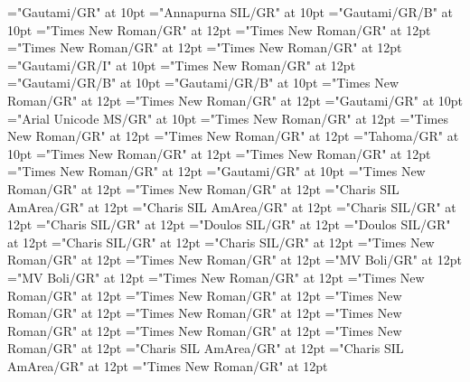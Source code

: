 \documentclass[a4paper]{article}
\begin{document}
\pagestyle{plain}
\sloppy
\setlength{\parfillskip}{0pt plus 1fil}
\font\xitemte="Gautami/GR" at 10pt
\font\xitemhi="Annapurna SIL/GR" at 10pt
\font\xitemxitemcomplexformformbefore="Gautami/GR/B" at 10pt
\font\xitemxitemcomplexformrefsbefore="Times New Roman/GR" at 12pt
\font\xitemxitemdefinitionbefore="Times New Roman/GR" at 12pt
\font\xitemxitementryrefcomponentbefore="Times New Roman/GR" at 12pt
\font\xitemxitementryreftypebefore="Times New Roman/GR" at 12pt
\font\xitemxitemexamplebefore="Gautami/GR/I" at 10pt
\font\xitemxitemexamplesbefore="Times New Roman/GR" at 12pt
\font\xitemxitemheadwordbefore="Gautami/GR/B" at 10pt
\font\xitemxitemLexEntrypublishStemComponentTargetHeadWordRefbefore="Gautami/GR/B" at 10pt
\font\xitemxitemLexEntryTypepublishStemComplexFormTypeReverseAbbrPubbefore="Times New Roman/GR" at 12pt
\font\xitemxitemLexEntryTypepublishStemEntryTypeAbbreviationPubbefore="Times New Roman/GR" at 12pt
\font\xitemxitemLexSensepublishStemGlossPubLdbefore="Gautami/GR" at 10pt
\font\xitemxitemLexSensepublishStemGlossPubLebefore="Arial Unicode MS/GR" at 10pt
\font\xitemxitempartofspeechbefore="Times New Roman/GR" at 12pt
\font\xitemxitempictureLabelbefore="Times New Roman/GR" at 12pt
\font\xitemxitemprimaryrefsbefore="Times New Roman/GR" at 12pt
\font\xitemxitempronunciationbefore="Tahoma/GR" at 10pt
\font\xitemxitempronunciationsbefore="Times New Roman/GR" at 12pt
\font\sensesensesensesbefore="Times New Roman/GR" at 12pt
\font\xitemxitemtranslationbefore="Times New Roman/GR" at 12pt
\font\xitemxitemtranslationLdbefore="Gautami/GR" at 10pt
\font\divarIQ="Times New Roman/GR" at 12pt
\font\spanarIQ="Times New Roman/GR" at 12pt
\font\divblz="Charis SIL AmArea/GR" at 12pt
\font\spanblz="Charis SIL AmArea/GR" at 12pt
\font\divbn="Charis SIL/GR" at 12pt
\font\spanbn="Charis SIL/GR" at 12pt
\font\divbzhfonipa="Doulos SIL/GR" at 12pt
\font\spanbzhfonipa="Doulos SIL/GR" at 12pt
\font\divbzh="Charis SIL/GR" at 12pt
\font\spanbzh="Charis SIL/GR" at 12pt
\font\divde="Times New Roman/GR" at 12pt
\font\spande="Times New Roman/GR" at 12pt
\font\divdv="MV Boli/GR" at 12pt
\font\spandv="MV Boli/GR" at 12pt
\font\divenfonipa="Times New Roman/GR" at 12pt
\font\spanenfonipa="Times New Roman/GR" at 12pt
\font\divenGB="Times New Roman/GR" at 12pt
\font\spanenGB="Times New Roman/GR" at 12pt
\font\divenPH="Times New Roman/GR" at 12pt
\font\spanenPH="Times New Roman/GR" at 12pt
\font\diven="Times New Roman/GR" at 12pt
\font\spanen="Times New Roman/GR" at 12pt
\font\divesaab="Charis SIL AmArea/GR" at 12pt
\font\spanesaab="Charis SIL AmArea/GR" at 12pt
\font\dives="Times New Roman/GR" at 12pt
\end{document}
